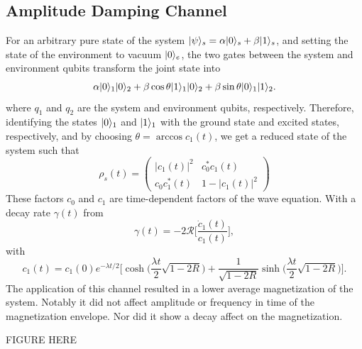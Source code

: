 \documentclass[12pt, twocolumn]{article}
\newcommand*{\eu}{e}
\DeclarePairedDelimiter{\ket}{\lvert}{\rangle}
\begin{document}
  \subsection{Amplitude Damping Channel}
  For an arbitrary pure state of the system \( \ket{\psi}_{s} = \alpha \ket{0}_{s} + \beta \ket{1}_{s} \), and setting the state of the environment to vacuum \( \ket{0}_{e} \), the two gates between the system and environment qubits transform the joint state into
  \begin{equation}
    \alpha \ket{0}_{1} \ket{0}_{2} + \beta \cos \theta \ket{1}_{1} \ket{0}_{2}
    + \beta \sin \theta \ket{0}_{1} \ket{1}_{2}.
  \end{equation}
  where \( q_{1} \) and \( q_{2} \) are the system and environment qubits, respectively. Therefore, identifying the states \( \ket{0}_{1} \) and \( \ket{1}_{1} \) with the ground state and excited states, respectively, and by choosing \( \theta = \arccos c_{1}(t) \), we get a reduced state of the system such that
  \begin{equation}
    \rho_{s}(t)
      = \begin{pmatrix}
          \lvert c_{1}(t) \rvert^{2} & c_{0}^{*} c_{1}(t)             \\
          c_{0} c_{1}^{*}(t)         & 1 - \lvert c_{1}(t) \rvert^{2}
        \end{pmatrix}
  \end{equation}
  These factors \( c_{0} \) and \( c_{1} \) are time-dependent factors of the wave equation. With a decay rate \( \gamma(t) \) from
  \begin{equation}
    \gamma(t) = -2 \mathcal{R} \biggl[ \frac{\dot{c}_{1}(t)}{c_{1}(t)} \biggr],
  \end{equation}
  with
  \begin{equation}
    c_{1}(t)
      = c_{1}(0) \eu^{-\lambda t / 2}
        \biggl[
          \cosh \biggl( \frac{\lambda t}{2} \sqrt{1 - 2 R} \biggr)
          + \frac{1}{\sqrt{1 - 2 R}}
            \sinh \biggl( \frac{\lambda t}{2} \sqrt{1 - 2 R} \biggr)
        \biggr].
  \end{equation}
  The application of this channel resulted in a lower average magnetization of the system. Notably it did not affect amplitude or frequency in time of the magnetization envelope. Nor did it show a decay affect on the magnetization.

  FIGURE HERE
\end{document}
